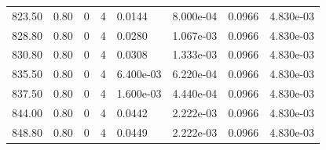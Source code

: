 \documentclass[preview]{standalone}
\begin{document}
{{{{{\begin{tabular}{L{1.2cm}C{1.2cm} C{0.3cm}C{0.5cm} C{1.4cm}C{1.4cm} C{1.4cm}C{1.4cm}}
  823.50  &  0.80  & 0     &  4 &  0.0144  & 8.000e-04  & 0.0966 &  4.830e-03   \\ 
  828.80  &  0.80  & 0     &  4 &  0.0280  & 1.067e-03  & 0.0966 &  4.830e-03   \\ 
  830.80  &  0.80  & 0     &  4 &  0.0308  & 1.333e-03  & 0.0966 &  4.830e-03   \\ 
  835.50  &  0.80  & 0     &  4 &  6.400e-03  & 6.220e-04  & 0.0966 &  4.830e-03   \\ 
  837.50  &  0.80  & 0     &  4 &  1.600e-03  & 4.440e-04  & 0.0966 &  4.830e-03   \\ 
  844.00  &  0.80  & 0     &  4 &  0.0442  & 2.222e-03  & 0.0966 &  4.830e-03   \\ 
  848.80  &  0.80  & 0     &  4 &  0.0449  & 2.222e-03  & 0.0966 &  4.830e-03   \\ 
\hline 
\end{tabular} 

}}}}}
\end{document}
